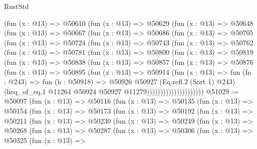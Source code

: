 \begin{lexlean}{RustStd}
\begin{coremodule}
        (fun (x : @13) =>
        @50610
          (fun (x : @13) =>
          @50629
            (fun (x : @13) =>
            @50648
              (fun (x : @13) =>
              @50667
                (fun (x : @13) =>
                @50686
                  (fun (x : @13) =>
                  @50705
                    (fun (x : @13) =>
                    @50724
                      (fun (x : @13) =>
                      @50743
                        (fun (x : @13) =>
                        @50762
                          (fun (x : @13) =>
                          @50781
                            (fun (x : @13) =>
                            @50800
                              (fun (x : @13) =>
                              @50819
                                (fun (x : @13) =>
                                @50838
                                  (fun (x : @13) =>
                                  @50857
                                    (fun (x : @13) =>
                                    @50876
                                      (fun (x : @13) =>
                                      @50895
                                        (fun (x : @13) =>
                                        @50914
                                          (fun (x : @13) =>
                                          fun (fn : @243) =>
                                          fun (h : @50918) =>
                                          @50926
                                            @50927
                                            (Eq.refl.{2} (Sort 1) @243)
                                            (heq_of_eq.{1}
                                              @11264
                                              @50924
                                              @50927
                                              @11279)))))))))))))))))))))
@51029 := @50097
    (fun (x : @13) =>
    @50116
      (fun (x : @13) =>
      @50135
        (fun (x : @13) =>
        @50154
          (fun (x : @13) =>
          @50173
            (fun (x : @13) =>
            @50192
              (fun (x : @13) =>
              @50211
                (fun (x : @13) =>
                @50230
                  (fun (x : @13) =>
                  @50249
                    (fun (x : @13) =>
                    @50268
                      (fun (x : @13) =>
                      @50287
                        (fun (x : @13) =>
                        @50306
                          (fun (x : @13) =>
                          @50325
                            (fun (x : @13) =>

\end{coremodule}
\end{lexlean}
